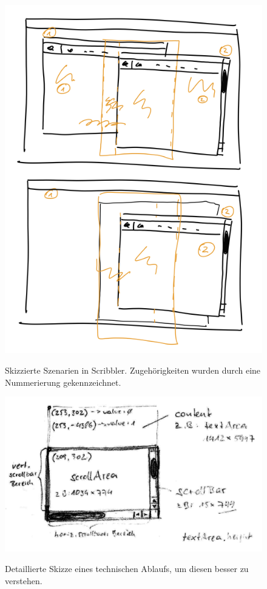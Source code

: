 \begin{figure}
	\begin{center}
	        {\includegraphics[width=0.8\linewidth]{gfx/scribblerSzenarien}}
		\caption[Skizzierte Szenarien in Scribbler]{Skizzierte Szenarien in Scribbler. Zugehörigkeiten wurden durch eine Nummerierung gekennzeichnet.}\label{fig:scribblerSzenarien}
	\end{center}
\end{figure}

\begin{figure}
	        {\includegraphics[width=1\linewidth]{gfx/scribblerDetailSkizze}}
		\caption[Detailskizze eines technischen Ablaufs]{Detaillierte Skizze eines technischen Ablaufs, um diesen besser zu verstehen.}\label{fig:scribblerDetailSkizze}
\end{figure}

